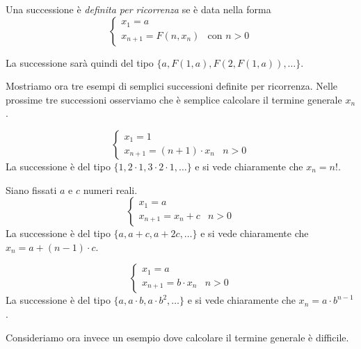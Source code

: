 \begin{definition}
Una successione è \emph{definita per ricorrenza} se è data nella forma
\begin{equation*}
\begin{cases}
x_1 = a \\
x_{n+1} = F(n, x_n) & \mbox{con }n > 0
\end{cases}
\end{equation*}
\end{definition}

La successione sarà quindi del tipo $\{a, F(1, a), F(2, F(1, a)), \ldots \}$.

Mostriamo ora tre esempi di semplici successioni definite per ricorrenza. Nelle prossime tre successioni osserviamo che è semplice calcolare il termine generale $x_n$.
\begin{example}
\begin{equation*}
\begin{cases}
x_1 = 1 \\
x_{n+1} = (n+1) \cdot x_n & \mbox{}n > 0
\end{cases}
\end{equation*}
La successione è del tipo $\{1, 2 \cdot 1, 3 \cdot 2 \cdot 1, \ldots \}$ e si vede chiaramente che $x_n = n!$.
\end{example}

\begin{example}
Siano fissati $a$ e $c$ numeri reali.
\begin{equation*}
\begin{cases}
x_1 = a\\
x_{n+1} = x_n + c& \mbox{}n > 0
\end{cases}
\end{equation*}
La successione è del tipo $\{a, a + c, a + 2c, \ldots \}$ e si vede chiaramente che $x_n = a + (n-1) \cdot c$.
\end{example}

\begin{example}
\begin{equation*}
\begin{cases}
x_1 = a\\
x_{n+1} = b \cdot x_n& \mbox{}n > 0
\end{cases}
\end{equation*}
La successione è del tipo $\{a, a \cdot b, a \cdot b^2, \ldots \}$ e si vede chiaramente che $x_n = a \cdot b^{n-1}$.
\end{example}

Consideriamo ora invece un esempio dove calcolare il termine generale è difficile.

